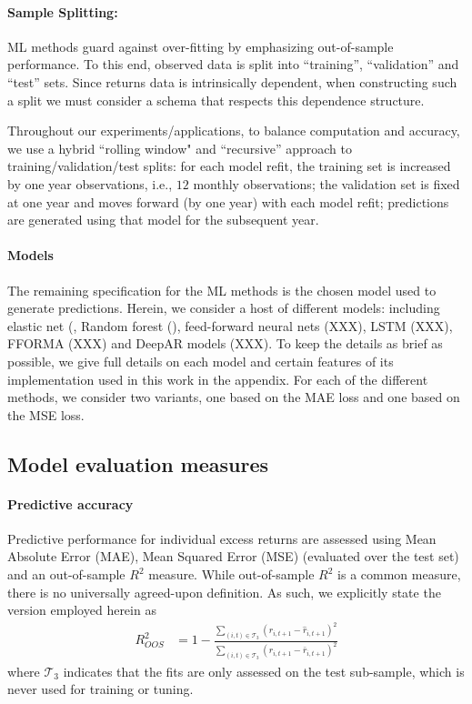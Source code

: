 \documentclass{article}
\begin{document}
\paragraph{Sample Splitting:} ML methods guard against over-fitting by emphasizing out-of-sample performance. To this end, observed data is split into ``training”, ``validation'' and ``test'' sets. Since returns data is intrinsically dependent, when constructing such a split we must consider a schema that respects this dependence structure. 

Throughout our experiments/applications, to balance computation and accuracy, we use a  hybrid ``rolling window"  and ``recursive'' approach to training/validation/test splits: for each model refit, the training set is increased by one year observations, i.e., $12$ monthly observations; the validation set is fixed at one year and moves forward (by one year) with each model refit; predictions are generated using that model for the subsequent year.


\paragraph{Models} The remaining specification for the ML methods is the chosen model used to generate predictions. Herein, we consider a host of different models: including elastic net (\cite{zou_regularization_2005}, Random forest (\cite{breiman_random_2001}), feed-forward neural nets (XXX), LSTM (XXX), FFORMA (XXX) and DeepAR models (XXX). To keep the details as brief as possible, we give full details on each model and certain features of its implementation used in this work in the appendix. For each of the different methods, we consider two variants, one based on the MAE loss and one based on the MSE loss. 

\subsection{Model evaluation measures}
\paragraph{Predictive accuracy}

Predictive performance for individual excess returns are assessed using Mean Absolute Error (MAE), Mean Squared Error (MSE) (evaluated over the test set) and an out-of-sample $R^2$ measure. While  out-of-sample $R^2$ is a common measure, there is no universally agreed-upon definition. As such, we explicitly state the version employed herein as
\begin{align}
R^2_{OOS} &= 1 - \frac{\sum_{(i, t)\in\mathcal{T}_3}(r_{i, t+1} - \widehat{r}_{i, t+1})^2}
{\sum_{(i, t)\in\mathcal{T}_3} \left( r_{i, t+1} - \bar{r}_{i, t+1} \right) ^2}
\end{align}
where $\mathcal{T}_3$ indicates that the fits are only assessed on the test sub-sample, which is never used for training or tuning.
\end{document}
